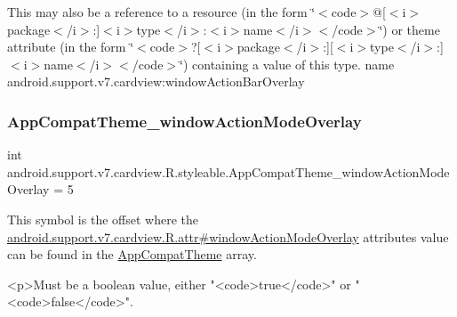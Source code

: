 This may also be a reference to a resource (in the form \char`\"{}$<$code$>$@\mbox{[}$<$i$>$package$<$/i$>$\+:\mbox{]}$<$i$>$type$<$/i$>$\+:$<$i$>$name$<$/i$>$$<$/code$>$\char`\"{}) or theme attribute (in the form \char`\"{}$<$code$>$?\mbox{[}$<$i$>$package$<$/i$>$\+:\mbox{]}\mbox{[}$<$i$>$type$<$/i$>$\+:\mbox{]}$<$i$>$name$<$/i$>$$<$/code$>$\char`\"{}) containing a value of this type.  name android.\+support.\+v7.\+cardview\+:window\+Action\+Bar\+Overlay \mbox{\label{classandroid_1_1support_1_1v7_1_1cardview_1_1R_1_1styleable_a2e20d285d36c8aee404b1d719af3b081}} 
\subsubsection{\texorpdfstring{App\+Compat\+Theme\+\_\+window\+Action\+Mode\+Overlay}{AppCompatTheme\_windowActionModeOverlay}}
{\footnotesize\ttfamily int android.\+support.\+v7.\+cardview.\+R.\+styleable.\+App\+Compat\+Theme\+\_\+window\+Action\+Mode\+Overlay = 5\hspace{0.3cm}{\ttfamily [static]}}

This symbol is the offset where the \hyperlink{classandroid_1_1support_1_1v7_1_1cardview_1_1R_1_1attr_a9c6ffb9526f039bcd2fa1ce1756eb371}{android.\+support.\+v7.\+cardview.\+R.\+attr\#window\+Action\+Mode\+Overlay} attribute\textquotesingle{}s value can be found in the \hyperlink{classandroid_1_1support_1_1v7_1_1cardview_1_1R_1_1styleable_a52e6f69f954ecc2622d72c0b4d298938}{App\+Compat\+Theme} array.

\begin{DoxyVerb}      <p>Must be a boolean value, either "<code>true</code>" or "<code>false</code>".
\end{DoxyVerb}
 

